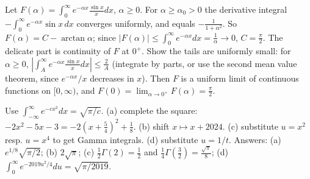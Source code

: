 \documentclass[11pt,a4paper]{article}
\begin{document}
Let \(F(\alpha)=\int_0^\infty e^{-\alpha x}\frac{\sin x}xdx\), \(\alpha\ge0\). For \(\alpha\ge\alpha_0\gt0\) the derivative integral \(-\int_0^\infty e^{-\alpha x}\sin x\,dx\) converges uniformly, and equals \(-\frac1{1+\alpha^2}\).
So \(F(\alpha)=C-\arctan\alpha\); since \(\lvert F(\alpha)\rvert\le\int_0^\infty e^{-\alpha x}dx=\frac1\alpha\to0\), \(C=\frac\pi2\).
The delicate part is continuity of \(F\) at \(0^+\). Show the tails are uniformly small: for \(\alpha\ge0\), \(\left\lvert\int_A^\infty e^{-\alpha x}\frac{\sin x}xdx\right\rvert\le\frac 2A\) (integrate by parts, or use the second mean value theorem, since \(e^{-\alpha x}/x\) decreases in \(x\)). Then \(F\) is a uniform limit of continuous functions on \([0,\infty)\), and \(F(0)=\lim_{\alpha\to0^+}F(\alpha)=\frac\pi2\).

Use \(\int_{-\infty}^\infty e^{-cx^2}dx=\sqrt{\pi/c}\). (a) complete the square: \(-2x^2-5x-3=-2(x+\frac54)^2+\frac18\). (b) shift \(x\mapsto x+2024\). (c) substitute \(u=x^2\) resp. \(u=x^4\) to get Gamma integrals. (d) substitute \(u=1/t\).
Answers: (a) \(e^{1/8}\sqrt{\pi/2}\); (b) \(2\sqrt\pi\); (c) \(\frac12\Gamma(2)=\frac12\) and \(\frac14\Gamma(\frac32)=\frac{\sqrt\pi}8\); (d) \(\int_0^\infty e^{-2019u^2/4}du=\sqrt{\pi/2019}\).
\end{document}

